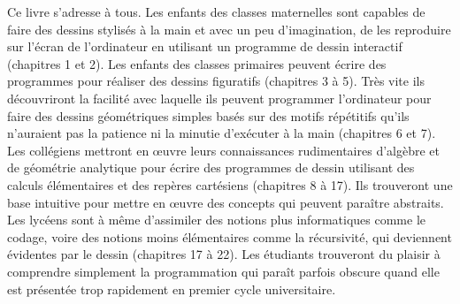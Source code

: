 \medskip

Ce livre s'adresse à tous. Les enfants des classes maternelles sont capables
de faire des dessins stylisés à la main et avec un peu d'imagination, de les 
reproduire sur l'écran
de l'ordinateur en utilisant un programme de dessin interactif (chapitres 1 et 2).
Les enfants des classes primaires peuvent écrire des programmes pour réaliser 
des dessins  figuratifs (chapitres 3 à 5). Très vite ils découvriront la facilité avec 
la\-quel\-le ils peuvent programmer l'ordinateur pour faire des dessins géométriques simples basés sur des
motifs répétitifs qu'ils n'auraient pas la patience ni la minutie d'exécuter
à la main (chapitres 6 et 7). Les collégiens mettront en œuvre leurs
connaissances rudimentaires d'algèbre et de géométrie analytique pour écrire des 
programmes de dessin
utilisant des calculs élémentaires et des repères cartésiens (chapitres 8 à 17). 
Ils trouveront une base 
intuitive pour mettre en œuvre des
concepts qui peuvent paraître abstraits. Les
lycéens sont à même d'assimiler des notions plus informatiques comme le 
codage, voire des notions moins élémentaires comme la 
récursivité, qui deviennent évidentes par le dessin (chapitres 17 à 22). Les étudiants
trouveront du plaisir à comprendre simplement la programmation qui paraît parfois obscure quand
elle est présentée trop rapidement en premier cycle universitaire. 

\medskip

